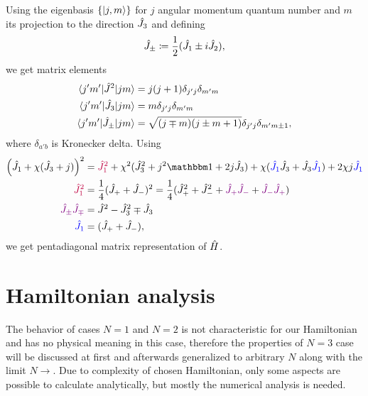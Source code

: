 Using the eigenbasis $\{\ket{j,m}\}$ for $j$ angular momentum quantum number and $m$ its projection to the direction $\hat{J}_3$ and defining
\begin{equation}
    \hat{J}_\pm\coloneqq\frac{1}{2}(\hat{J}_1\pm i\hat{J}_2),
\end{equation}
we get matrix elements
\begin{align}
    \braket{j'm'|\hat{J}^2|jm} &= j(j+1)\delta_{j'j}\delta_{m'm}\\
    \braket{j'm'|\hat{J}_3|jm} &= m \delta_{j'j}\delta_{m'm}\\
    \braket{j'm'|\hat{J}_\pm|jm} &= \sqrt{(j\mp m)(j\pm m+1)}\delta_{j'j}\delta_{m'm\pm 1},
\end{align}
where $\delta_{a'b}$ is Kronecker delta. Using
\begin{align}
        \left(\J_1+\chi(\J_3+j)\right)^2 &= \textcolor{purple}{\J_1^2} +\chi^2 (\J_3^2+j^2\Id+2j\J_3)+\chi(\textcolor{blue}{\J_1}\J_3+\J_3\textcolor{blue}{\J_1})+2\chi j\textcolor{blue}{\J_1}\\
        \textcolor{purple}{\J_1^2}&= \frac{1}{4}(\J_++\J_-)^2= \frac{1}{4}(\J_+^2+\J_-^2+\textcolor{violet}{\J_+\J_-}+\textcolor{violet}{\J_-\J_+})\\ 
        \textcolor{violet}{\J_\pm\J_\mp}&=\J^2-\J_3^2 \mp \J_3\\
        \textcolor{blue}{\J_1}&=(\J_+ +\J_-),
\end{align}
we get pentadiagonal matrix representation of $\hat{H}$.


\section{Hamiltonian analysis}
The behavior of cases $N=1$ and $N=2$ is not characteristic for our Hamiltonian and has no physical meaning in this case, therefore the properties of $N=3$ case will be discussed at first and afterwards generalized to arbitrary $N$ along with the limit $N\rightarrow$. Due to complexity of chosen Hamiltonian, only some aspects are possible to calculate analytically, but mostly the numerical analysis is needed.



